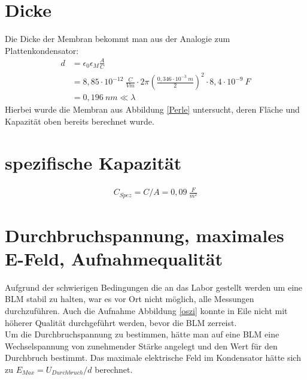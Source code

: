 \documentclass{include/thesisclass3}
\begin{document}
\section{Dicke}
Die Dicke der Membran bekommt man aus der Analogie zum Plattenkondensator:
\begin{align*}
	d&=\epsilon_0\epsilon_M \frac{A}{C}\\
	&=8,85\cdot 10^{-12}~\si{\frac{C}{Vm}}\cdot 2 \pi \left(\frac{0,346\cdot 10^{-3}~\si{m}}{2}\right)^2\cdot 8,4\cdot 10^{-9}~\si{F}\\
	&=0,196~\si{nm} \ll \lambda
\end{align*}
Hierbei wurde die Membran aus Abbildung \ref{Perle} untersucht, deren Fläche und Kapazität oben bereits berechnet wurde. 

\section{spezifische Kapazität}
\begin{align*}
C_{Spez}=C/A=0,09~\si{\frac{F}{m^2}}
\end{align*}
\section{Durchbruchspannung, maximales E-Feld, Aufnahmequalität}
Aufgrund der schwierigen Bedingungen die an das Labor gestellt werden um eine BLM stabil zu halten, war es vor Ort nicht möglich, alle Messungen durchzuführen. Auch die Aufnahme Abbildung \ref{oszi} konnte in Eile nicht mit höherer Qualität durchgeführt werden, bevor die BLM zerreist.\\
Um die Durchbruchspannung zu bestimmen, hätte man auf eine BLM eine Wechselspannung von zunehmender Stärke angelegt und den Wert für den Durchbruch bestimmt. Das maximale elektrische Feld im Kondensator hätte sich zu $E_{Max}=U_{Durchbruch}/d$ berechnet.
\end{document}

